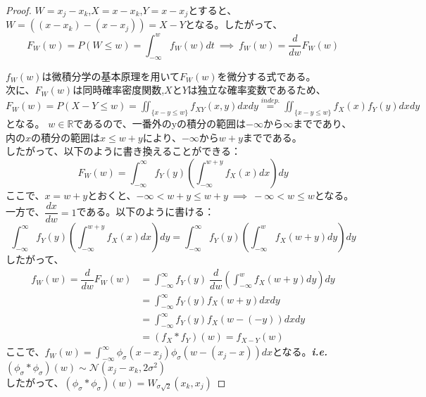 \documentclass[dvipdfmx,a4paper,12pt]{jarticle}
\makeatletter
\newcommand*{\ie}{\textbf{\textit{i.e.}}\@\xspace}
\theoremstyle{mystyle}
\makeatother
\begin{document}
\begin{proof}

$W=x_j-x_k$,$X=x-x_k$,$Y=x-x_j$とすると、$W=((x-x_k)-(x-x_j))=X-Y$となる。したがって、
$$
F_{W}(w)=P(W\leq w)=\displaystyle\int_{-\infty}^{w}f_{W}(w)dt\ \implies\ f_{W}(w)=\frac{d}{dw}F_{W}(w)
$$ 

\noindent
$f_{W}(w)$は微積分学の基本原理を用いて$F_{W}(w)$を微分する式である。\\

\noindent
次に、$F_{W}(w)$は同時確率密度関数,$X$と$Y$は独立な確率変数であるため、$F_{W}(w)=P(X-Y\leq w)=\displaystyle \iint_{\{x-y\leq w\}} f_{XY}(x,y)dxdy\overset{indep.}{=}\iint_{\{x-y\leq w\}} f_{X}(x)f_{Y}(y)dxdy$となる。
$w\in \mathbb{R}$であるので、一番外のyの積分の範囲は$-\infty$から$\infty$までであり、内の$x$の積分の範囲は$x\leq w+y$により、$-\infty$から$w+y$までである。\\

\noindent
したがって、以下のように書き換えることができる：
$$
  F_{W}(w)=\int_{-\infty}^{\infty} f_{Y}(y)\left(\int_{-\infty}^{w+y} f_{X}(x)dx\right)dy
$$
ここで、$x=w+y$とおくと、$-\infty< w+y\leq w+y\ \implies\ -\infty < w\leq w$となる。一方で、$\dfrac{dx}{dw}=1$である。以下のように書ける：
$$
\int_{-\infty}^{\infty} f_{Y}(y)\left(\int_{-\infty}^{w+y} f_{X}(x)dx\right)dy=\int_{-\infty}^{\infty} f_{Y}(y)\left(\int_{-\infty}^{w} f_{X}(w+y)dy\right)dy
$$
\noindent
したがって、
\begin{align*}
  f_{W}(w)=\dfrac{d}{dw}F_{W}(w)&=\int_{-\infty}^{\infty} f_{Y}(y)\ \dfrac{d}{dw}\left(\int_{-\infty}^{w} f_{X}(w+y)dy\right)dy  \\
  &=\int_{-\infty}^{\infty} f_{Y}(y)f_{X}(w+y)dxdy \\
  &=\int_{-\infty}^{\infty} f_{Y}(y)f_{X}(w-(-y))dxdy \\
  &=(f_{X}*f_{Y})(w)=f_{X-Y}(w)
\end{align*}
ここで、$f_{W}(w)=\displaystyle\int_{-\infty}^{\infty} \phi_{\sigma}(x-x_j)\phi_{\sigma}(w-(x_j-x))dx $となる。\ie $(\phi_{\sigma}\ast\phi_{\sigma})(w)\sim \mathcal{N}(x_j-x_k,2\sigma^2)$\\

\noindent
したがって、$(\phi_{\sigma}\ast\phi_{\sigma})(w)=W_{\sigma\sqrt{2}}(x_k, x_j)$

\end{proof}
\end{document}
